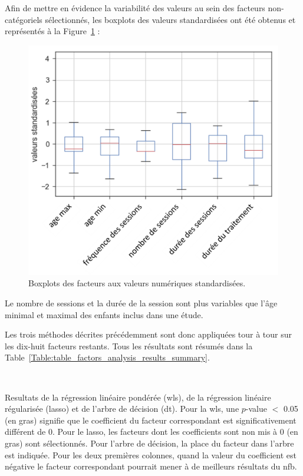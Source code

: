 Afin de mettre en évidence la variabilité des valeurs au sein des facteurs non-catégoriels sélectionnés, les boxplots des valeurs standardisées ont 
été obtenus et représentés à la Figure~\ref{Figure:factors-boxplots} :
\begin{figure}[h!]
  \centering
	\includegraphics[width=0.7\linewidth]{figures/chapter-3/factors-distribution-of-factors} 
  \caption{Boxplots des facteurs aux valeurs numériques standardisées.} 
  \label{Figure:factors-boxplots}
\end{figure}

Le nombre de sessions et la durée de la session sont plus variables que l'âge minimal et maximal des enfants inclus dans une étude. 

Les trois méthodes décrites précédemment sont donc appliquées tour à tour sur les dix-huit facteurs restants. Tous les résultats sont résumés dans la 
Table~\ref{Table:table_factors_analysis_results_summary}.

\newpage\
\begin{table}[h!]
  \centering
  \caption{Resultats de la régression linéaire pondérée (\gls{wls}), de la régression linéaire régularisée (\gls{lasso}) et de l'arbre de décision (\gls{dt}). Pour la \gls{wls}, une $p$-value $<$ 0.05 
	(en gras) signifie que le coefficient du facteur correspondant est significativement différent de 0. Pour le \gls{lasso}, les facteurs dont les coefficients sont non mis à 0 (en gras) sont 
	sélectionnés. Pour l'arbre de décision, la place du facteur dans l'arbre est indiquée. Pour les deux premières colonnes, quand la valeur du coefficient est négative le facteur 
	correspondant pourrait mener à de meilleurs résultats du \gls{nfb}.}
  
  \label{Table:table_factors_analysis_results_summary}
\end{table}

